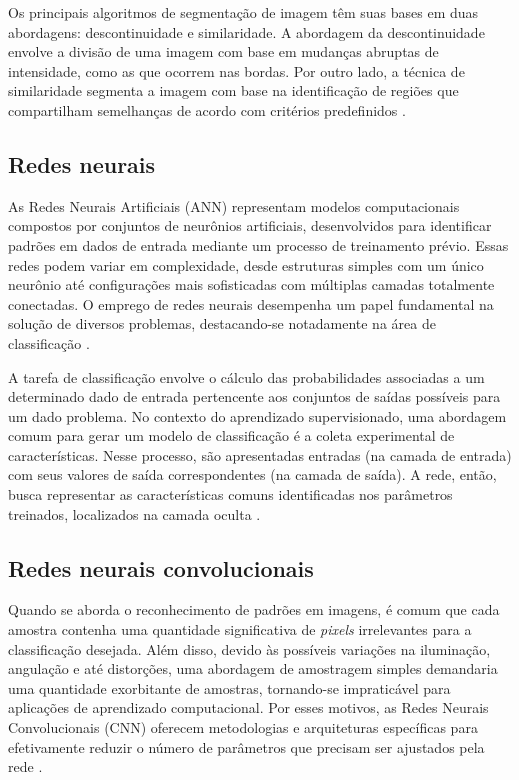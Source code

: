 Os principais algoritmos de segmentação de imagem têm suas bases em duas 
abordagens: descontinuidade e similaridade. A abordagem da descontinuidade 
envolve a divisão de uma imagem com base em mudanças abruptas de 
intensidade, como as que ocorrem nas bordas. Por outro lado, a técnica 
de similaridade segmenta a imagem com base na identificação de regiões 
que compartilham semelhanças de acordo com critérios 
predefinidos \cite{gonzalez2010}.

\subsection{Redes neurais}\label{subsec:redes}

As Redes Neurais Artificiais (ANN) representam modelos computacionais 
compostos por conjuntos de neurônios artificiais, desenvolvidos para 
identificar padrões em dados de entrada mediante um processo de treinamento 
prévio. Essas redes podem variar em complexidade, desde estruturas simples 
com um único neurônio até configurações mais sofisticadas com múltiplas 
camadas totalmente conectadas. O emprego de redes neurais desempenha um 
papel fundamental na solução de diversos problemas, destacando-se 
notadamente na área de classificação \cite{italo2021}.

A tarefa de classificação envolve o cálculo das probabilidades associadas 
a um determinado dado de entrada pertencente aos conjuntos de saídas 
possíveis para um dado problema. No contexto do aprendizado supervisionado, 
uma abordagem comum para gerar um modelo de classificação é a coleta 
experimental de características. Nesse processo, são apresentadas entradas 
(na camada de entrada) com seus valores de saída correspondentes 
(na camada de saída). A rede, então, busca representar as características 
comuns identificadas nos parâmetros treinados, localizados na camada 
oculta \cite{italo2021}.

\subsection{Redes neurais convolucionais}\label{subsec:convolucionais}

Quando se aborda o reconhecimento de padrões em imagens, é comum que cada 
amostra contenha uma quantidade significativa de \textit{pixels} irrelevantes para 
a classificação desejada. Além disso, devido às possíveis variações na 
iluminação, angulação e até distorções, uma abordagem de amostragem 
simples demandaria uma quantidade exorbitante de amostras, tornando-se 
impraticável para aplicações de aprendizado computacional. Por esses 
motivos, as Redes Neurais Convolucionais (CNN) oferecem metodologias 
e arquiteturas específicas para efetivamente reduzir o número de 
parâmetros que precisam ser ajustados pela rede \cite{italo2021}.

